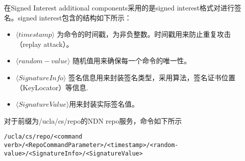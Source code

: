 在Signed Interest additional components采用的是signed interest格式对进行签名。signed interest包含的结构如下所示：
\begin{itemize}
\item $\langle timestamp\rangle$ 为命令的时间戳，为非负整数。时间戳用来防止重复攻击（replay attack）。
\item $\langle random-value\rangle$ 随机值用来确保每一个命令的唯一性。
\item $\langle SignatureInfo\rangle$ 签名信息用来封装签名类型，采用算法，签名证书位置（KeyLocator）等信息.
\item $\langle SignatureValue\rangle$用来封装实际签名值。
\end{itemize}

对于前缀为/ucla/cs/repo的NDN repo服务，命令如下所示
\begin{framed}
\begin{tiny}
\begin{verbatim}
/ucla/cs/repo/<command verb>/<RepoCommandParameter>/<timestamp>/<random-value>/<SignatureInfo>/<SignatureValue>
\end{verbatim}
\end{tiny}
\end{framed}

